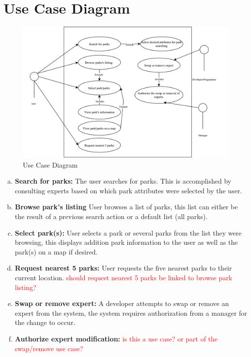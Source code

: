\documentclass[titlepage]{article}
\begin{document}
\section{Use Case Diagram}
\label{sec:use_case_diagram}


\begin{figure}[htbp]
\centerline{\includegraphics[width=1.0\textwidth]{images//UseCase}}
\caption{Use Case Diagram}
\label{useCaseDiagram}
\end{figure}

\begin{enumerate}[a)]
    \item \textbf{Search for parks:} The user searches for parks. This is accomplished by consulting experts based on which park attributes were selected by the user.
    \item \textbf{Browse park's listing} User browses a list of parks, this list can either be the result of a previous search action or a default list (all parks).
    \item \textbf{Select park(s):} User selects a park or several parks from the list they were browsing, this displays addition park information to the user as well as the park(s) on a map if desired.
    \item \textbf{Request nearest 5 parks:} User requests the five nearest parks to their current location. \textcolor{red}{should request nearest 5 parks be linked to browse park listing?}
    \item \textbf{Swap or remove expert:} A developer attempts to swap or remove an expert from the system, the system requires authorization from a manager for the change to occur.
    \item \textbf{Authorize expert modification:} \textcolor{red}{is this a use case? or part of the swap/remove use case?}
\end{enumerate}
\end{document}
